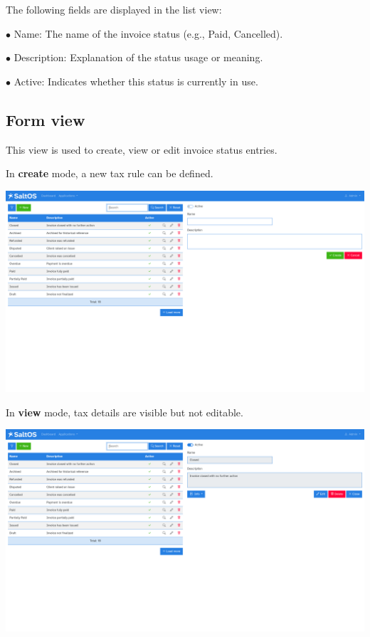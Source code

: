 \documentclass[a4paper]{article}
\begin{document}
The following fields are displayed in the list view:

\begin{compactitem}
\item[\color{myblue}$\bullet$] Name: The name of the invoice status (e.g., Paid, Cancelled).
\item[\color{myblue}$\bullet$] Description: Explanation of the status usage or meaning.
\item[\color{myblue}$\bullet$] Active: Indicates whether this status is currently in use.
\end{compactitem}

\hypertarget{toc144}{}
\subsection{Form view}

This view is used to create, view or edit invoice status entries.

In \textbf{create} mode, a new tax rule can be defined.

\begin{center}\includegraphics[width=1\textwidth]{../ujest/snaps/test-screenshots-js-screenshots-sales-invoices-status-create-en-us-1-snap.png}\end{center}

In \textbf{view} mode, tax details are visible but not editable.

\begin{center}\includegraphics[width=1\textwidth]{../ujest/snaps/test-screenshots-js-screenshots-sales-invoices-status-view-10-en-us-1-snap.png}\end{center}
\end{document}
